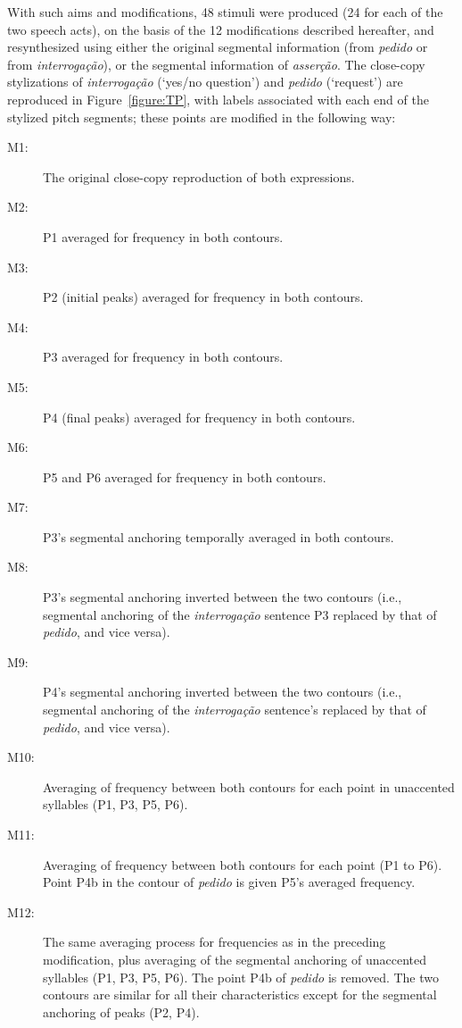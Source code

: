 \documentclass[output=paper]{LSP/langsci}
\begin{document}
With such aims and modifications, 48 stimuli were produced (24 for each of the two speech acts), on the basis of the 12 modifications described hereafter, and resynthesized using either the original segmental information (from \textit{pedido} or from \textit{interrogação}), or the segmental information of \textit{asserção}. 
The close-copy stylizations of \textit{interrogação} (`yes/no question') and \textit{pedido} (`request') are reproduced in Figure~\ref{figure:TP}, with labels associated with each end of the stylized pitch segments; these points are modified in the following way:
\begin{description}
\item [M1:] The original close-copy reproduction of both expressions.
\item [M2:] P1 averaged for frequency in both contours.
\item [M3:] P2 (initial peaks) averaged for frequency in both contours.
\item [M4:] P3 averaged for frequency in both contours.
\item [M5:] P4 (final peaks) averaged for frequency in both contours.
\item [M6:] P5 and P6 averaged for frequency in both contours.
\item [M7:] P3's segmental anchoring temporally averaged in both contours.
\item [M8:] P3's segmental anchoring inverted between the two contours (i.e., segmental anchoring of the \textit{interrogação} sentence P3 replaced by that of \textit{pedido}, and vice versa).
\item [M9:] P4's segmental anchoring inverted between the two contours (i.e., segmental anchoring of the \textit{interrogação} sentence's  replaced by that of \textit{pedido}, and vice versa).
\item [M10:] Averaging of frequency between both contours for each point in unaccented syllables (P1, P3, P5, P6).
\item [M11:] Averaging of frequency between both contours for each point (P1 to P6). Point P4b in the contour of \textit{pedido} is given P5's averaged frequency.
\item [M12:] The same averaging process for frequencies as in the preceding modification, plus averaging of the segmental anchoring of unaccented syllables (P1, P3, P5, P6). The point P4b of \textit{pedido} is removed. The two contours are similar for all their characteristics except for the segmental anchoring of peaks (P2, P4).
\end{description}
\end{document}
